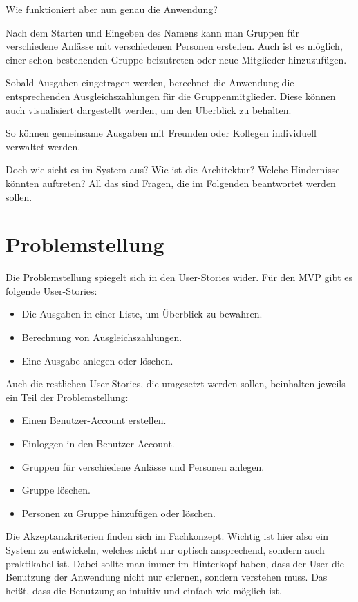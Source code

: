 \documentclass[conference]{IEEEtran}
\begin{document}
Wie funktioniert aber nun genau die Anwendung?

Nach dem Starten und Eingeben des Namens kann man Gruppen für
verschiedene Anlässe mit verschiedenen Personen erstellen. Auch
ist es möglich, einer schon bestehenden Gruppe beizutreten oder
neue Mitglieder hinzuzufügen.

Sobald Ausgaben eingetragen werden,
berechnet die Anwendung die entsprechenden Ausgleichszahlungen
für die Gruppenmitglieder. Diese können auch visualisiert dargestellt
werden, um den Überblick zu behalten.

So können gemeinsame Ausgaben
mit Freunden oder Kollegen individuell verwaltet werden.

Doch wie sieht es im System aus? Wie ist die Architektur? Welche Hindernisse könnten auftreten?
All das sind Fragen, die im Folgenden beantwortet werden sollen.

\section{Problemstellung}
Die Problemstellung spiegelt sich in den \gls{User-Stories} wider. Für den \gls{MVP} gibt es folgende User-Stories:
\begin{itemize}
    \item Die Ausgaben in einer Liste, um Überblick zu bewahren.
    \item Berechnung von Ausgleichszahlungen.
    \item Eine Ausgabe anlegen oder löschen.
\end{itemize}
Auch die restlichen User-Stories, die umgesetzt werden sollen, beinhalten jeweils ein Teil der Problemstellung:
\begin{itemize}
    \item Einen Benutzer-Account erstellen.
    \item Einloggen in den Benutzer-Account.
    \item Gruppen für verschiedene Anlässe und Personen anlegen.
    \item Gruppe löschen.
    \item Personen zu Gruppe hinzufügen oder löschen.
\end{itemize}
Die Akzeptanzkriterien finden sich im Fachkonzept.
Wichtig ist hier also ein System zu entwickeln, welches nicht nur optisch ansprechend, sondern auch praktikabel ist.
Dabei sollte man immer im Hinterkopf haben, dass der User die Benutzung der Anwendung nicht nur erlernen, sondern verstehen muss.
Das heißt, dass die Benutzung so intuitiv und einfach wie möglich ist.
\end{document}
